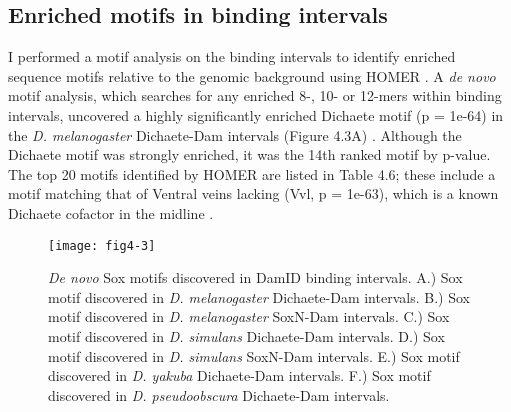 \subsection{Enriched motifs in binding intervals}
I performed a motif analysis on the binding intervals to identify enriched sequence motifs relative to the genomic background using HOMER \citep{heinz_simple_2010}. A \emph{de novo} motif analysis, which searches for any enriched 8-, 10- or 12-mers within binding intervals, uncovered a highly significantly enriched Dichaete motif (p = 1e-64) in the \emph{D. melanogaster} Dichaete-Dam intervals (Figure 4.3A) \citep{aleksic_role_2013}. Although the Dichaete motif was strongly enriched, it was the 14th ranked motif by p-value. The top 20 motifs identified by HOMER are listed in Table 4.6; these include a motif matching that of Ventral veins lacking (Vvl, p = 1e-63), which is a known Dichaete cofactor in the midline \citep{aleksic_role_2013,soriano_drosophila_1998}.

\begin{figure}[ht]
	\centering
	\texttt{[image: fig4-3]}
	\caption[\emph{De novo} Sox motifs discovered in DamID binding intervals]{\emph{De novo} Sox motifs discovered in DamID binding intervals. A.) Sox motif discovered in \emph{D. melanogaster} Dichaete-Dam intervals. B.) Sox motif discovered in \emph{D. melanogaster} SoxN-Dam intervals. C.) Sox motif discovered in \emph{D. simulans} Dichaete-Dam intervals. D.) Sox motif discovered in \emph{D. simulans} SoxN-Dam intervals. E.) Sox motif discovered in \emph{D. yakuba} Dichaete-Dam intervals. F.) Sox motif discovered in \emph{D. pseudoobscura} Dichaete-Dam intervals.}
	\label{Figure 4.3}
\end{figure}

